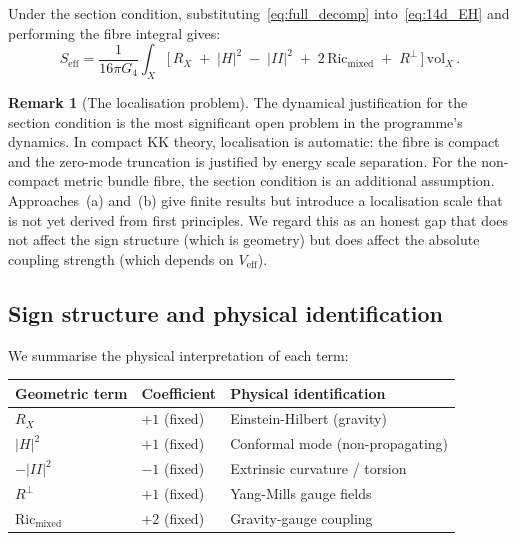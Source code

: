 \documentclass[12pt,a4paper]{article}
\theoremstyle{definition}
\newtheorem{remark}[theorem]{Remark}
\begin{document}
Under the section condition, substituting~\eqref{eq:full_decomp} into~\eqref{eq:14d_EH} and performing the fibre integral gives:
\begin{equation}
\label{eq:4d_action}
S_{\mathrm{eff}} = \frac{1}{16\pi G_4} \int_X \Big[\, R_X \;+\; |H|^2 \;-\; |II|^2 \;+\; 2\,\mathrm{Ric}_{\mathrm{mixed}} \;+\; R^\perp \,\Big]\, \mathrm{vol}_X\,.
\end{equation}

\begin{remark}[The localisation problem]
\label{rem:localisation}
The dynamical justification for the section condition is the most significant open problem in the programme's dynamics.
In compact KK theory, localisation is automatic: the fibre is compact and the zero-mode truncation is justified by energy scale separation.
For the non-compact metric bundle fibre, the section condition is an additional assumption.
Approaches~(a) and~(b) give finite results but introduce a localisation scale that is not yet derived from first principles.
We regard this as an honest gap that does not affect the sign structure (which is geometry) but does affect the absolute coupling strength (which depends on $V_{\mathrm{eff}}$).
\end{remark}

\subsection{Sign structure and physical identification}

We summarise the physical interpretation of each term:

\begin{center}
\renewcommand{\arraystretch}{1.3}
\begin{tabular}{lll}
\toprule
\textbf{Geometric term} & \textbf{Coefficient} & \textbf{Physical identification} \\
\midrule
$R_X$ & $+1$ (fixed) & Einstein-Hilbert (gravity) \\
$|H|^2$ & $+1$ (fixed) & Conformal mode (non-propagating) \\
$-|II|^2$ & $-1$ (fixed) & Extrinsic curvature / torsion \\
$R^\perp$ & $+1$ (fixed) & Yang-Mills gauge fields \\
$\mathrm{Ric}_{\mathrm{mixed}}$ & $+2$ (fixed) & Gravity-gauge coupling \\
\bottomrule
\end{tabular}
\end{center}
\end{document}
